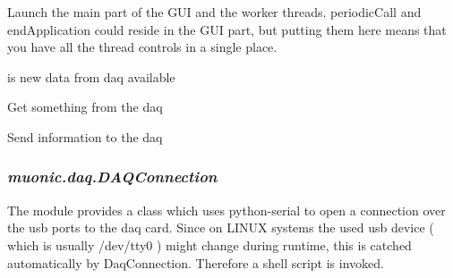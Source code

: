 \documentclass[letterpaper,10pt,english]{sphinxmanual}
\begin{document}
\begin{fulllineitems}
\label{muonic:muonic.daq.DAQProvider.DAQProvider}
Launch the main part of the GUI and the worker threads. periodicCall and
endApplication could reside in the GUI part, but putting them here
means that you have all the thread controls in a single place.

\begin{fulllineitems}
\label{muonic:muonic.daq.DAQProvider.DAQProvider.data_available}
is new data from daq available

\end{fulllineitems}


\begin{fulllineitems}
\label{muonic:muonic.daq.DAQProvider.DAQProvider.get}
Get something from the daq

\end{fulllineitems}


\begin{fulllineitems}
\label{muonic:muonic.daq.DAQProvider.DAQProvider.put}
Send information to the daq

\end{fulllineitems}


\end{fulllineitems}



\subsubsection{\emph{muonic.daq.DAQConnection}}
\label{muonic:muonic-daq-daqconnection}
The module provides a class which uses python-serial to open a connection over the usb ports to the daq card. Since on LINUX systems the used usb device ( which is usually /dev/tty0 ) might change during runtime, this is catched automatically by DaqConnection. Therefore a shell script is invoked.
\label{muonic:module-muonic.daq.DaqConnection}
\end{document}
